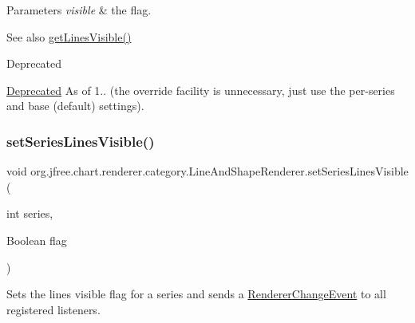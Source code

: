 \begin{DoxyParams}{Parameters}
{\em visible} & the flag.\\
\hline
\end{DoxyParams}
\begin{DoxySeeAlso}{See also}
\mbox{\hyperlink{classorg_1_1jfree_1_1chart_1_1renderer_1_1category_1_1_line_and_shape_renderer_aae2830cd3d5576be04342cb538b08c4c}{get\+Lines\+Visible()}}
\end{DoxySeeAlso}
\begin{DoxyRefDesc}{Deprecated}
\item[\mbox{\hyperlink{deprecated__deprecated000188}{Deprecated}}]As of 1.. (the override facility is unnecessary, just use the per-\/series and base (default) settings). \end{DoxyRefDesc}
\mbox{\label{classorg_1_1jfree_1_1chart_1_1renderer_1_1category_1_1_line_and_shape_renderer_a7f0605e3100eca00637cb838a78244fe}} 
\subsubsection{\texorpdfstring{set\+Series\+Lines\+Visible()}{setSeriesLinesVisible()}\hspace{0.1cm}{\footnotesize\ttfamily [1/2]}}
{\footnotesize\ttfamily void org.\+jfree.\+chart.\+renderer.\+category.\+Line\+And\+Shape\+Renderer.\+set\+Series\+Lines\+Visible (\begin{DoxyParamCaption}\item[{int}]{series,  }\item[{Boolean}]{flag }\end{DoxyParamCaption})}

Sets the \textquotesingle{}lines visible\textquotesingle{} flag for a series and sends a \mbox{\hyperlink{}{Renderer\+Change\+Event}} to all registered listeners.


